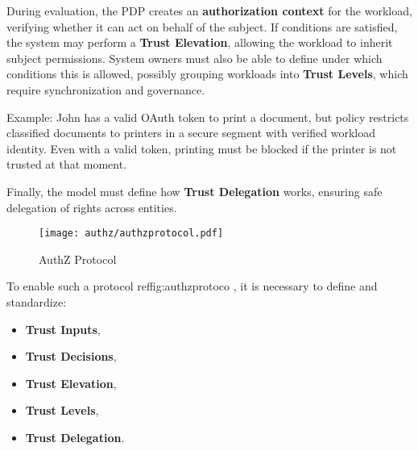 \vspace{0.5em}  
During evaluation, the PDP creates an \textbf{authorization context} for the workload, 
verifying whether it can act on behalf of the subject.  
If conditions are satisfied, the system may perform a \textbf{Trust Elevation}, 
allowing the workload to inherit subject permissions.  
System owners must also be able to define under which conditions this is allowed, 
possibly grouping workloads into \textbf{Trust Levels}, which require synchronization and governance.  

\begin{boxF}
Example: John has a valid OAuth token to print a document, 
but policy restricts classified documents to printers in a secure segment with verified workload identity.  
Even with a valid token, printing must be blocked if the printer is not trusted at that moment.
\end{boxF}

Finally, the model must define how \textbf{Trust Delegation} works, 
ensuring safe delegation of rights across entities.

\begin{figure}[htbp]
    \centering
    \texttt{[image: authz/authzprotocol.pdf]}
    \caption{AuthZ Protocol}
    \label{fig:authzprotocol}
\end{figure}

\vspace{0.5em}  
To enable such a protocol ref{fig:authzprotoco} , it is necessary to define and standardize:
\begin{itemize}
    \item \textbf{Trust Inputs},
    \item \textbf{Trust Decisions},
    \item \textbf{Trust Elevation},
    \item \textbf{Trust Levels},
    \item \textbf{Trust Delegation}.
\end{itemize}
